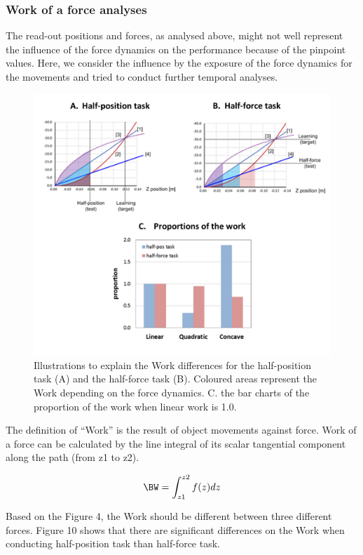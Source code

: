 \subsubsection{Work of a force analyses}
The read-out positions and forces, as analysed above, might not well represent the influence of the force dynamics on the performance because of the pinpoint values. Here, we consider the influence by the exposure of the force dynamics for the movements and tried to conduct further temporal analyses.
%
\begin{figure}
  \centering
  \includegraphics[scale=0.5]{Chie/figs/Figure10.png}
  \caption{Illustrations to explain the Work differences for the half-position task (A) and the half-force task (B). Coloured areas represent the Work depending on the force dynamics. C. the bar charts of the proportion of the work when linear work is 1.0. }
  \label{work}
\end{figure}
The definition of “Work” is the result of object movements against force. Work of a force can be calculated by the line integral of its scalar tangential component along the path (from z1 to z2).

%
\begin{equation}
  \BW = \int_{z1}^{z2} f(z) dz
\end{equation}
%

Based on the Figure 4, the Work should be different between three different forces.
Figure 10 shows that there are significant differences on the Work when conducting half-position task than half-force task.

